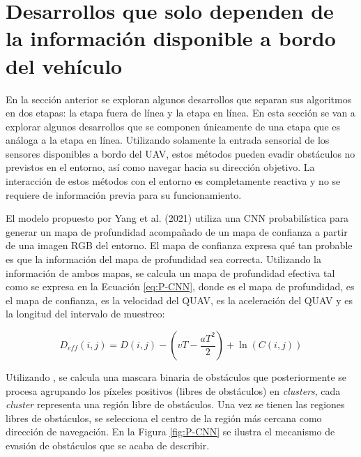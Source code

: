 \section{Desarrollos que solo dependen de la información disponible a bordo del vehículo}

\label{sec::prev-local}

En la sección anterior se exploran algunos desarrollos que separan sus algoritmos en dos etapas: la etapa fuera de línea y la etapa en línea. En esta sección se van a explorar algunos desarrollos que se componen únicamente de una etapa que es análoga a la etapa en línea. Utilizando solamente la entrada sensorial de los sensores disponibles a bordo del UAV, estos métodos pueden evadir obstáculos no previstos en el entorno, así como navegar hacia su dirección objetivo. La interacción de estos métodos con el entorno es completamente reactiva y no se requiere de información previa para su funcionamiento.

El modelo propuesto por Yang et al. (2021) \cite{Yang2021} utiliza una CNN probabilística para generar un mapa de profundidad acompañado de un mapa de confianza a partir de una imagen RGB del entorno. El mapa de confianza expresa qué tan probable es que la información del mapa de profundidad sea correcta. Utilizando la información de ambos mapas, se calcula un mapa de profundidad efectiva tal como se expresa en la Ecuación \ref{eq:P-CNN}, donde  es el mapa de profundidad,  es el mapa de confianza,  es la velocidad del QUAV,  es la aceleración del QUAV y  es la longitud del intervalo de muestreo:

\begin{equation}
\label{eq:P-CNN}
    D_{eff}(i,j) = D(i,j) - (vT - \frac{aT^2}{2}) + \ln{(C(i,j))}
\end{equation}

Utilizando , se calcula una mascara binaria de obstáculos  que posteriormente se procesa agrupando los píxeles positivos (libres de obstáculos) en \textit{clusters}, cada \textit{cluster} representa una región libre de obstáculos. Una vez se tienen las regiones libres de obstáculos, se selecciona el centro de la región más cercana como dirección de navegación. En la Figura \ref{fig:P-CNN} se ilustra el mecanismo de evasión de obstáculos que se acaba de describir.

